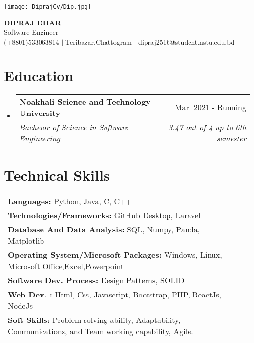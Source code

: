 \documentclass[11pt,a4paper]{article}
\makeatletter
\newcommand{\resumeSubheading}[4]{
  \vspace{-2pt}\item
    \begin{tabular*}{0.97\textwidth}[t]{l@{\extracolsep{\fill}}r}
      \textbf{#1} & #2 \\
      \textit{\small#3} & \textit{\small #4} \\
    \end{tabular*}\vspace{-7pt}
}
\newcommand{\resumeSubHeadingListStart}{\begin{itemize}[leftmargin=0.15in, label={}]}
\newcommand{\resumeSubHeadingListEnd}{\end{itemize}}
\makeatother
\begin{document}
\begin{center}
    \begin{minipage}{0.2\textwidth}
        \texttt{[image: DiprajCv/Dip.jpg]}
    \end{minipage}
    \hspace{0.05\textwidth}
    \begin{minipage}{0.7\textwidth}
        {\Huge \textbf{DIPRAJ DHAR}} \\
        \vspace{1pt}
        {\large Software Engineer} \\
        \small
         (+8801)533063814 $|$ 
         Teribazar,Chattogram $|$
         dipraj2516@student.nstu.edu.bd \\
        \vspace{2pt}
        \href{https://www.linkedin.com/in/dipraj-dhar/?lipi=urn%3Ali%3Apage%3Ad_flagship3_notifications%3B9sd8NUJAQUuGry5eW5jlMQ%3D%3D}{\faIcon{linkedin}} \quad
        \href{https://github.com/dipgitcom}{} \quad
        \href{https://dipraj-portfolio.vercel.app/}{}
    \end{minipage}
\end{center}


\section{Education}
\resumeSubHeadingListStart
\resumeSubheading
{Noakhali Science and Technology University}{Mar. 2021 - Running}
{Bachelor of Science in Software Engineering}{3.47 out of 4 up to 6th semester}
\resumeSubHeadingListEnd

\section{Technical Skills}
\begin{tabular*}{\textwidth}{@{}l@{\extracolsep{\fill}}r@{}}
\textbf{Languages:}  Python, Java, C, C++ \\
\textbf{Technologies/Frameworks:}  GitHub Desktop, Laravel \\
\textbf{Database And Data Analysis:}  SQL, Numpy, Panda, Matplotlib \\
\textbf{Operating System/Microsoft Packages:} Windows, Linux, Microsoft Office,Excel,Powerpoint \\
\textbf{Software Dev. Process:} Design Patterns, SOLID \\
\textbf{Web Dev. :} Html, Css, Javascript, Bootstrap, PHP, ReactJs, NodeJs  \\
\textbf{Soft Skills:}  Problem-solving ability, Adaptability, Communications, and Team working capability, Agile. \\
\end{tabular*}
\end{document}
